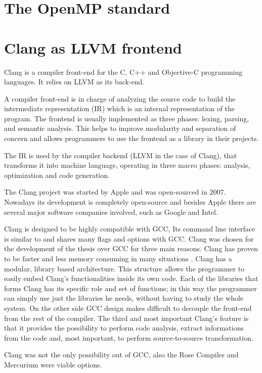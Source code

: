 \documentclass[a4paper,11pt,oneside]{book}
\begin{document}
\section{The OpenMP standard}
\label{chap:openmp}

\section{Clang as LLVM frontend}

Clang \cite{clang} is a compiler front-end for the C, C++ and Objective-C programming languages. It relies on LLVM as its back-end. 

A compiler front-end is in charge of analyzing the source code to build the intermediate representation (IR) which is an internal representation of the program. The front\-end is usually implemented as three phases: lexing, parsing, and semantic analysis. This helps to improve modularity and separation of concern and allows programmers to use the front\-end as a library in their projects. 

The IR is used by the compiler back\-end (LLVM in the case of Clang), that transforms it into machine language, operating in three macro phases: analysis, optimization and code generation. 

The Clang project was started by Apple and was open-sourced in 2007. Nowadays its development is completely open-source and besides Apple there are several major software companies involved, such as Google and Intel.

Clang is designed to be highly compatible with GCC, Its command line interface is similar to and shares many flags and options with GCC. Clang was chosen for the development of the thesis over GCC for three main reasons. Clang has proven to be faster and less memory consuming in many situations \cite{clanggcc}. Clang has a modular, library based architecture. This structure allows the programmer to easily embed Clang’s functionalities inside its own code. Each of the libraries that forms Clang has its specific role and set of functions; in this way the programmer can simply use just the libraries he needs, without having to study the whole system. On the other side GCC design makes difficult to decouple the front-end from the rest of the compiler.
The third and most important Clang’s feature is that it provides the possibility to perform code analysis, extract informations from the code and, most important, to perform source-to-source transformation.

Clang was not the only possibility out of GCC, also the Rose Compiler and Mercurium were viable options. 
\end{document}

